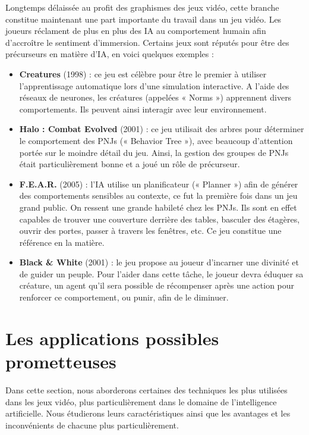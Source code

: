 \documentclass[a4paper, 12pt]{article} %
\begin{document}
Longtemps délaissée au profit des graphismes des jeux vidéo, cette branche constitue maintenant une part importante du travail dans un jeu vidéo. Les joueurs réclament de plus en plus des IA au comportement humain afin d'accroître le sentiment d’immersion. Certains jeux sont réputés pour être des précurseurs en matière d’IA\cite{history}, en voici quelques exemples : 

\begin{itemize}
	\item \textbf{Creatures} (1998) : ce jeu est célèbre pour être le premier à utiliser l’apprentissage automatique lors d’une simulation interactive. A l’aide des réseaux de neurones, les créatures (appelées « Norms ») apprennent divers comportements. Ils peuvent ainsi interagir avec leur environnement. 

	\item \textbf{Halo : Combat Evolved} (2001) : ce jeu utilisait des arbres pour déterminer le comportement des PNJs (« Behavior Tree »), avec beaucoup d’attention portée sur le moindre détail du jeu. Ainsi, la gestion des groupes de PNJs était particulièrement bonne et a joué un rôle de précurseur. 

	\item \textbf{F.E.A.R.} (2005) : l’IA utilise un planificateur (« Planner ») afin de générer des comportements sensibles au contexte, ce fut la première fois dans un jeu grand public. On ressent une grande habileté chez les PNJs. Ils sont en effet capables de trouver une couverture derrière des tables, basculer des étagères, ouvrir des portes, passer à travers les fenêtres, etc. Ce jeu constitue une référence en la matière.  

	\item \textbf{Black \& White} (2001) : le jeu propose au joueur d’incarner une divinité et de guider un peuple. Pour l’aider dans cette tâche, le joueur devra éduquer sa créature, un agent qu’il sera possible de récompenser après une action pour renforcer ce comportement, ou punir, afin de le diminuer. 
\end{itemize}

\newpage
\section{Les applications possibles prometteuses}

Dans cette section, nous aborderons certaines des techniques les plus utilisées dans les jeux vidéo, plus particulièrement dans le domaine de l’intelligence artificielle. Nous étudierons leurs caractéristiques ainsi que les avantages et les inconvénients de chacune plus particulièrement.
\end{document}
